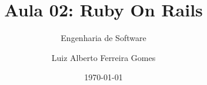 \author{Luiz Alberto Ferreira Gomes}
\title{Aula 02: Ruby On Rails}
\subtitle{Engenharia de Software}
\date{\today}

